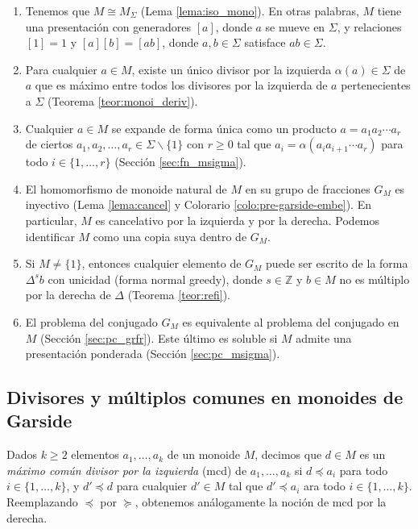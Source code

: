 \documentclass[12pt]{book}
\theoremstyle{definition}
\begin{document}
\begin{enumerate}[label=(\arabic*)]
\item Tenemos que $M\cong M_\Sigma$ (Lema \ref{lema:iso_mono}). En otras palabras, $M$ tiene una presentación con generadores $[a]$, donde $a$ se mueve en $\Sigma$, y relaciones $[1]=1$ y $[a][b]=[ab]$, donde $a,b\in\Sigma$ satisface $ab\in\Sigma$.
\item Para cualquier $a\in M$, existe un único divisor por la izquierda $\alpha(a)\in\Sigma$ de $a$ que es máximo entre todos los divisores por la izquierda de $a$ pertenecientes a $\Sigma$ (Teorema \ref{teor:monoi_deriv}).
\item Cualquier $a\in M$ se expande de forma única como un producto $a=a_1a_2\cdots a_r$ de ciertos $a_1,a_2,\ldots,a_r\in\Sigma \backslash\{1\}$ con $r\geq 0$ tal que $a_i=\alpha(a_ia_{i+1}\cdots a_r)$ para todo $i\in\{1,\ldots,r\}$ (Sección \ref{sec:fn_msigma}).
\item El homomorfismo de monoide natural de $M$ en su grupo de fracciones $G_M$ es inyectivo (Lema \ref{lema:cancel} y Colorario \ref{colo:pre-garside-embe}). En particular, $M$ es cancelativo por la izquierda y por la derecha. Podemos identificar $M$ como una copia suya dentro de $G_M$.
\item Si $M\neq \{1\}$, entonces cualquier elemento de $G_M$ puede ser escrito de la forma $\Delta^s b$ con unicidad (forma normal greedy), donde $s\in\mathbb{Z}$ y $b\in M$ no es múltiplo por la derecha de $\Delta$ (Teorema \ref{teor:refi}).
\item El problema del conjugado $G_M$ es equivalente al problema del conjugado en $M$ (Sección \ref{sec:pc_grfr}). Este último es soluble si $M$ admite una presentación ponderada (Sección \ref{sec:pc_msigma}).
\end{enumerate}

\subsection{Divisores y múltiplos comunes en monoides de Garside}

Dados $k\geq 2$ elementos $a_1,\ldots,a_k$ de un monoide $M$, decimos que $d\in M$ es un \textit{máximo común divisor por la izquierda} (mcd) de $a_1,\ldots,a_k$ si $d\preceq a_i$ para todo $i\in\{1,\ldots,k\}$, y $d'\preceq d$ para cualquier $d'\in M$ tal que $d'\preceq a_i$ ara todo $i\in\{1,\ldots,k\}$. Reemplazando $\preceq$ por $\succeq$, obtenemos análogamente la noción de mcd por la derecha.
\end{document}
